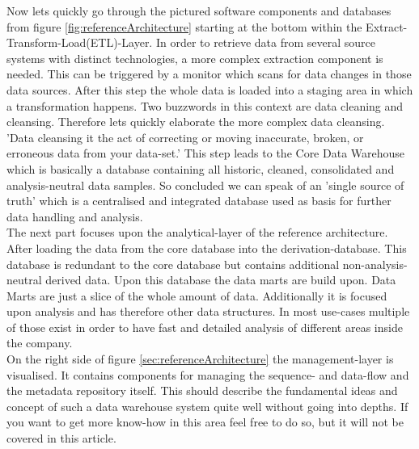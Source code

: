 Now lets quickly go through the pictured software components and databases from figure \ref{fig:referenceArchitecture} starting at the bottom within the Extract-Transform-Load(ETL)-Layer. In order to retrieve data from several source systems with distinct technologies, a more complex extraction component is needed. This can be triggered by a monitor which scans for data changes in those data sources.\newline
After this step the whole data is loaded into a staging area in which a transformation happens. Two buzzwords in this context are data cleaning and cleansing. Therefore lets quickly elaborate the more complex data cleansing. 
'Data cleansing it the act of correcting or moving inaccurate, broken, or erroneous data from your data-set.'\cite{dataCleansing}
This step leads to the Core Data Warehouse which is basically a database containing all historic, cleaned, consolidated and analysis-neutral data samples. So concluded we can speak of an 'single source of truth'\cite{scriptRasch} which is a centralised and integrated database used as basis for further data handling and analysis.\newline
\\
The next part focuses upon the analytical-layer of the reference architecture. After loading the data from the core database into the derivation-database. This database is redundant to the core database but contains additional non-analysis-neutral derived data. Upon this database the data marts are build upon. Data Marts are just a slice of the whole amount of data. Additionally it is focused upon analysis and has therefore other data structures. In most use-cases multiple of those exist in order to have fast and detailed analysis of different areas inside the company.\newline
\\
On the right side of figure \ref{sec:referenceArchitecture} the management-layer is visualised. It contains components for managing the sequence- and data-flow and the metadata repository itself.\newline
This should describe the fundamental ideas and concept of such a data warehouse system quite well without going into depths. If you want to get more know-how in this area feel free to do so, but it will not be covered in this article. 